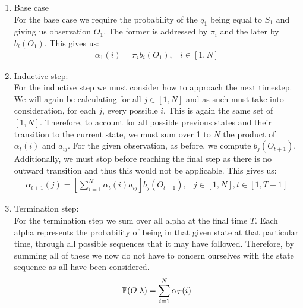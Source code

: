 \begin{enumerate}[i]
    \item Base case \\
    For the base case we require the probability of the $q_1$ being equal to $S_1$ and giving us observation $O_1$. The former is addressed by $\pi_i$ and the later by $b_i(O_1)$. This gives us:
    \begin{eqnarray}
        \alpha_1(i) = \pi_i b_i(O_1), & i \in [1,N]
    \end{eqnarray}

    \item Inductive step: \\
    For the inductive step we must consider how to approach the next timestep. We will again be calculating for all $j\in [1,N]$ and as such must take into consideration, for each $j$, every possible $i$. This is again the same set of $[1,N]$. Therefore, to account for all possible previous states and their transition to the current state, we must sum over 1 to $N$ the product of $\alpha_t(i)$ and $a_{ij}$. For the given observation, as before, we compute $b_j(O_{t+1})$. Additionally, we must stop before reaching the final step as there is no outward transition and thus this would not be applicable. This gives us:
    \begin{eqnarray}
        \alpha_{t+1}(j) = \left[\sum_{i=1}^N \alpha_t(i)a_{ij}\right] b_j(O_{t+1}), & j \in [1,N], t \in [1,T-1]
    \end{eqnarray}

    \item Termination step: \\
    For the termination step we sum over all alpha at the final time $T$. Each alpha represents the probability of being in that given state at that particular time, through all possible sequences that it may have followed. Therefore, by summing all of these we now do not have to concern ourselves with the state sequence as all have been considered.
    \begin{eqnarray}
        \mathbb{P} (O | \lambda) = \sum_{i=1}^N \alpha_T(i)
    \end{eqnarray}
\end{enumerate}

